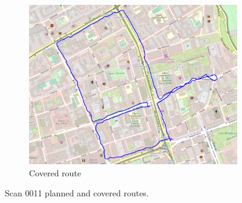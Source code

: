 \documentclass[a4paper,12pt]{book}
\begin{document}
\begin{enumerate}
\begin{figure}[H]
\begin{subfigure}{.88\textwidth}
			\includegraphics[width=1\linewidth]{route_c11}
			\caption{Covered route}
			\label{fig:b11}
		\end{subfigure}
		\caption{Scan 0011 planned and covered routes.}
		\label{fig:fig11}
	\end{figure} 
\end{enumerate}
\end{document}
